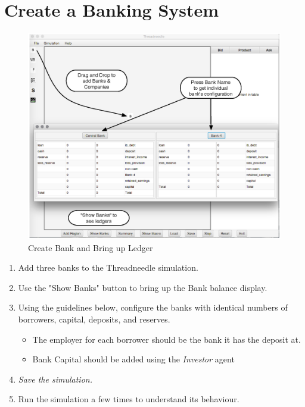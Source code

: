 \documentclass{article}
\begin{document}

\section{Create a Banking System}
\begin{figure}[h]
\begin{center}
\includegraphics[width=12cm]{lab_fig_1.eps} 
\caption{Create Bank and Bring up Ledger}
\end{center}
\end{figure}

\begin{enumerate}
\item Add three banks to the Threadneedle simulation.
\item Use the "Show Banks" button to bring up the Bank balance display.
\item Using the guidelines below, configure the banks with identical
numbers of borrowers, capital, deposits, and reserves.
\begin{itemize}
\item The employer for each borrower should be the bank it has the deposit at.
\item Bank Capital should be added using the \emph{Investor} agent
\end{itemize}
\item \emph{Save the simulation.}
\item Run the simulation a few times to understand its behaviour.
\end{enumerate}
\end{document}
